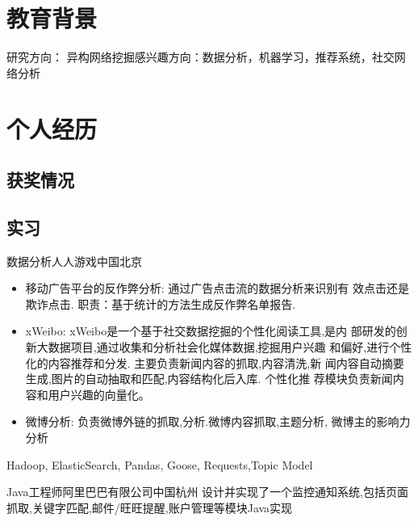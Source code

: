 \documentclass[11pt,a4paper]{moderncv}
\newcommand\myitem{\item[\textbullet]\hspace*{.5em} }
\begin{document}
\begin{CJK}{UTF8}{gkai}
\maketitle

\section{教育背景}
{研究方向： 异构网络挖掘}{感兴趣方向：数据分析，机器学习，推荐系统，社交网络分析}

 {}{} %

\section{个人经历}

\subsection{获奖情况}

\subsection{实习}
{数据分析}{人人游戏}{中国北京}{}{}{%
  \begin{itemize}\setlength\itemindent{2pt}
    \myitem 移动广告平台的反作弊分析: 通过广告点击流的数据分析来识别有
    效点击还是欺诈点击. 职责：基于统计的方法生成反作弊名单报告.
    \myitem xWeibo: xWeibo是一个基于社交数据挖掘的个性化阅读工具,是内
    部研发的创新大数据项目,通过收集和分析社会化媒体数据,挖掘用户兴趣
    和偏好,进行个性化的内容推荐和分发. 主要负责新闻内容的抓取,内容清洗,新
    闻内容自动摘要生成,图片的自动抽取和匹配,内容结构化后入库. 个性化推
    荐模块负责新闻内容和用户兴趣的向量化。
    \myitem 微博分析: 负责微博外链的抓取,分析.微博内容抓取,主题分析,
    微博主的影响力分析
  \end{itemize}
}{Hadoop, ElasticSearch, Pandas, Goose, Requests,Topic Model}

\vspace{8 mm}
{Java工程师}{阿里巴巴有限公司}{中国杭州}
{设计并实现了一个监控通知系统,包括页面抓取,关键字匹配,邮件/旺旺提醒,账户管理等模块}{Java实现}{}


\end{CJK}
\end{document}
